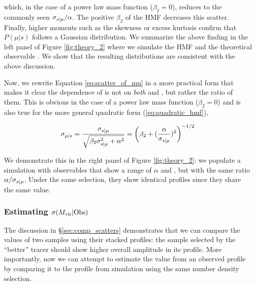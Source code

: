\documentclass[fleqn,usenatbib,useAMS,english]{mnras}
\begin{document}
    \noindent which, in the case of a power law mass function ($\beta_2 = 0$), reduces to the
    commonly seen $\sigma_{s{} | \mu{}} / \alpha$. The positive $\beta_2$ of the HMF decreases
    this scatter. Finally, higher moments such as the skewness or excess kurtosis confirm that
    $P(\mu | s)$ follows a Gaussian distribution.
    We summarize the above finding in the left panel of Figure \ref{fig:theory_2} where we
    simulate the HMF and the theoretical observable \obsSym{}.
    We show that the resulting distributions are consistent with the above discussion.

    Now, we rewrite Equation \ref{eq:scatter_of_mu} in a more practical form that makes it clear
    the dependence of \scatterMhaloObsSym{} is not on {\em both} \scatterObsSymMhalo{} and
    \slope, but rather the ratio of them.
    This is obvious in the case of a power law mass function ($\beta_2 = 0$) and is also true
    for the more general quadratic form (\ref{eq:quadratic_hmf}),

    \begin{equation}
        \sigma_{\mu{} | s{}}{}
        	= \frac{\sigma_{s{} | \mu{}}}{\sqrt{\beta_2 \sigma_{s{} | \mu{}}^2 + \alpha^2}}
            = \left(\beta_2 + (\frac{\alpha}{\sigma_{s{} | \mu{}}})^2\right)^{-1/2}
        \label{eq:ratio_is_what_matters}
    \end{equation}

    We demonstrate this in the right panel of Figure \ref{fig:theory_2}:
    we populate a simulation with observables that show a range of $\alpha$ and
    \scatterObsSymMhalo{}, but with the same ratio $\alpha / \sigma_{s{} | \mu{}}$.
    Under the same \topn{} selection, they show identical \dsigma{} profiles since they share the
    same \scatterMhaloObsSym{} value.


\subsubsection{Estimating $\sigma(M_{\rm vir} | {\rm Obs})$}
    \label{sec:estimate_scatter}

    The discussion in \S\ref{sec:comp_scatters} demonstrates that we can compare the
    \scatterMhaloObsSym{} values of two \topn{} samples using their stacked \dsigma{} profiles:
    the sample selected by the ``better'' \mhalo{} tracer should show higher overall amplitude in
    its \dsigma{} profile.
    More importantly, now we can attempt to estimate the \scatterMhaloObsSym{} value from an
    observed \dsigma{} profile by comparing it to the \dsigma{} profile from simulation using the
    same number density selection.
\end{document}
